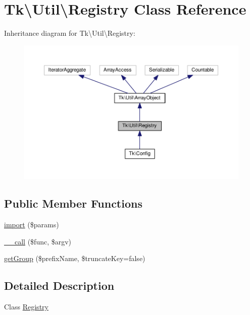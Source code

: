 \hypertarget{classTk_1_1Util_1_1Registry}{\section{Tk\textbackslash{}Util\textbackslash{}Registry Class Reference}
\label{classTk_1_1Util_1_1Registry}
}


Inheritance diagram for Tk\textbackslash{}Util\textbackslash{}Registry\+:\nopagebreak
\begin{figure}[H]
\begin{center}
\leavevmode
\includegraphics[width=350pt]{classTk_1_1Util_1_1Registry__inherit__graph}
\end{center}
\end{figure}
\subsection*{Public Member Functions}
\begin{DoxyCompactItemize}
\item 
\hyperlink{classTk_1_1Util_1_1Registry_ad77f2caa13367ec913d7a0cbd0f621e0}{import} (\$params)
\item 
\hyperlink{classTk_1_1Util_1_1Registry_acb2cdab0c6dc77e1dd1ac5d545f9e478}{\+\_\+\+\_\+call} (\$func, \$argv)
\item 
\hyperlink{classTk_1_1Util_1_1Registry_a7bf583880559e551cb530ad0e354d971}{get\+Group} (\$prefix\+Name, \$truncate\+Key=false)
\end{DoxyCompactItemize}


\subsection{Detailed Description}
Class \hyperlink{classTk_1_1Util_1_1Registry}{Registry}

